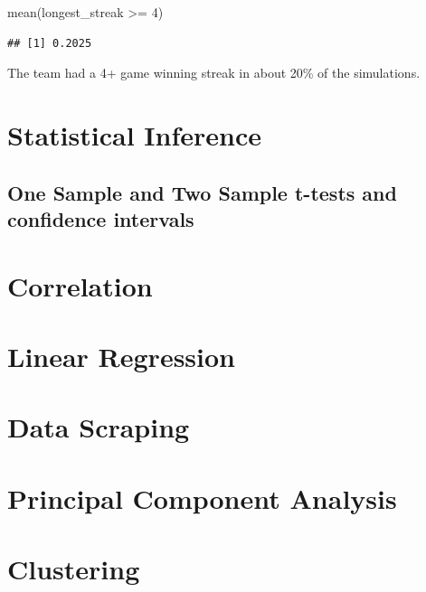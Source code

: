 \documentclass[
  11pt,
]{book}
\newenvironment{Shaded}{\begin{snugshade}}{\end{snugshade}}
\newcommand{\DecValTok}[1]{\textcolor[rgb]{0.00,0.00,0.81}{#1}}
\newcommand{\FunctionTok}[1]{\textcolor[rgb]{0.00,0.00,0.00}{#1}}
\newcommand{\NormalTok}[1]{#1}
\newcommand{\SpecialCharTok}[1]{\textcolor[rgb]{0.00,0.00,0.00}{#1}}
\theoremstyle{definition}
\theoremstyle{definition}
\theoremstyle{definition}
\theoremstyle{definition}
\theoremstyle{remark}
\begin{document}
\begin{Shaded}
\begin{Highlighting}[]
\FunctionTok{mean}\NormalTok{(longest\_streak }\SpecialCharTok{\textgreater{}=} \DecValTok{4}\NormalTok{)}
\end{Highlighting}
\end{Shaded}

\begin{verbatim}
## [1] 0.2025
\end{verbatim}

The team had a 4+ game winning streak in about 20\% of the simulations.

\hypertarget{statistical-inference}{%
\chapter{Statistical Inference}\label{statistical-inference}}

\hypertarget{one-sample-and-two-sample-t-tests-and-confidence-intervals}{%
\section{One Sample and Two Sample t-tests and confidence intervals}\label{one-sample-and-two-sample-t-tests-and-confidence-intervals}}

\hypertarget{correlation}{%
\chapter{Correlation}\label{correlation}}

\hypertarget{linear-regression}{%
\chapter{Linear Regression}\label{linear-regression}}

\hypertarget{data-scraping}{%
\chapter{Data Scraping}\label{data-scraping}}

\hypertarget{principal-component-analysis}{%
\chapter{Principal Component Analysis}\label{principal-component-analysis}}

\hypertarget{clustering}{%
\chapter{Clustering}\label{clustering}}
\end{document}
